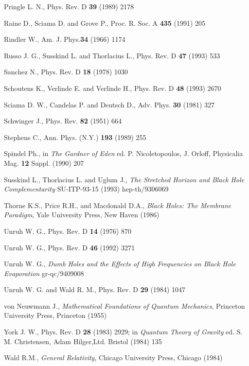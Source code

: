 \documentclass[12pt,oneside]{report}
\begin{document}
{\begin{thebibliography}{999}
 Pringle L. N., Phys. Rev. D {\bf 39} (1989) 2178

Raine D., Sciama D. and Grove P., Proc. R. Soc. A {\bf 435} (1991)
205

Rindler W., Am. J. Phys.{\bf  34} (1966) 1174

 Russo J. G., Susskind L. and Thorlacius L., Phys. Rev. D {\bf 47}
(1993) 533


 Sanchez N., Phys. Rev. D {\bf 18} (1978) 1030

 Schoutens K., Verlinde E. and Verlinde H., Phys. Rev. D {\bf 48}
(1993) 2670 


Sciama D. W., Candelas P. and Deutsch D., Adv. Phys. {\bf 30} (1981)
327

Schwinger J., Phys. Rev. {\bf 82} (1951) 664

Stephens C., Ann. Phys. (N.Y.) {\bf 193} (1989) 255

Spindel Ph., in {\em The Gardner of Eden} ed. P. Nicoletopoulos, J. Orloff,
 Physicalia Mag. {\bf 12} Suppl. (1990) 207 

 Susskind L., Thorlacius L. and Uglum J., {\em 
The Stretched Horizon and Black Hole Complementarity}
SU-ITP-93-15 (1993) hep-th/9306069 


Thorne K.S., Price R.H., and Macdonald D.A., {\em Black Holes: The
Membrane Paradigm}, Yale University Press, New Haven (1986)

Unruh W. G., Phys. Rev. D {\bf  14} (1976) 870

Unruh W. G., Phys. Rev. D {\bf 46} (1992) 3271

Unruh W. G.,{ \em  Dumb Holes and the Effects of High Frequencies on Black Hole Evaporation} gr-qc/9409008

Unruh W. G. and Wald R. M., Phys. Rev. D {\bf 29} (1984) 1047



von Neuwmann J., {\em Mathematical Foundations of Quantum
Mechanics}, Princeton University Press, Princeton (1955)

 York J. W., Phys. Rev. D {\bf 28} (1983) 2929;
in {\em Quantum Theory of Gravity} ed.  S. M. Christensen, Adam Hilger,Ltd. Bristol (1984)
135

Wald R.M., {\em General Relativity}, Chicago University Press,
Chicago (1984)


\end{thebibliography}}
\end{document}

